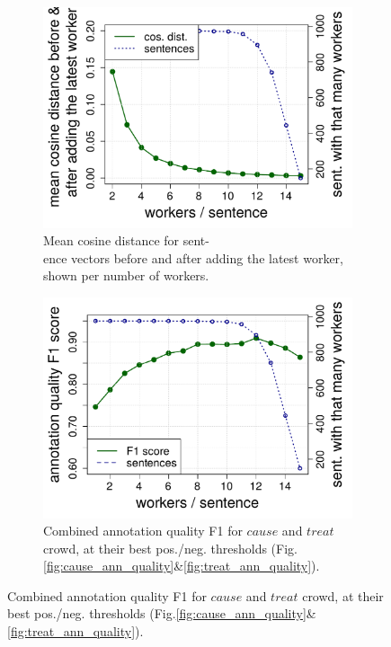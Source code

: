 \begin{figure}[htb!]
\centering
\begin{subfigure}{.5\textwidth}
\includegraphics[width=\linewidth]{img/cos_sim_per_worker.pdf}
\caption{Mean cosine distance for sent- \\ ence vectors before and after adding the latest worker, shown per number of workers.}
\label{fig:cos_sim_per_worker}
\end{subfigure}%
\begin{subfigure}{.5\textwidth}
\includegraphics[width=\linewidth]{img/ann_quality_f1.pdf}
\caption{Combined annotation quality F1 for $cause$ and $treat$ crowd, at their best pos./neg. thresholds (Fig.\ref{fig:cause_ann_quality}\&\ref{fig:treat_ann_quality}).}
\label{fig:ann_quality_f1}
\end{subfigure}
\end{figure}


